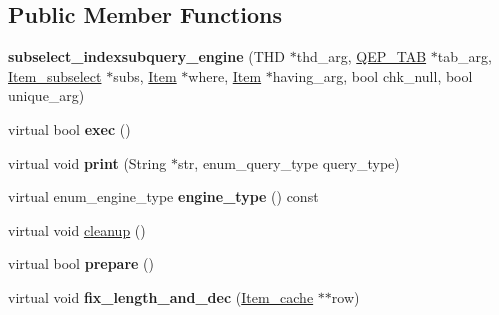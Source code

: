 \subsection*{Public Member Functions}
\begin{DoxyCompactItemize}
\item 
\mbox{\label{classsubselect__indexsubquery__engine_ab82444e407990fa6239accace7323951}} 
{\bfseries subselect\+\_\+indexsubquery\+\_\+engine} (T\+HD $\ast$thd\+\_\+arg, \mbox{\hyperlink{classQEP__TAB}{Q\+E\+P\+\_\+\+T\+AB}} $\ast$tab\+\_\+arg, \mbox{\hyperlink{classItem__subselect}{Item\+\_\+subselect}} $\ast$subs, \mbox{\hyperlink{classItem}{Item}} $\ast$where, \mbox{\hyperlink{classItem}{Item}} $\ast$having\+\_\+arg, bool chk\+\_\+null, bool unique\+\_\+arg)
\item 
\mbox{\label{classsubselect__indexsubquery__engine_a5eedf659adbcec020dfeabb8ffc7c261}} 
virtual bool {\bfseries exec} ()
\item 
\mbox{\label{classsubselect__indexsubquery__engine_a40f9e9028e88c03598675963ed70e273}} 
virtual void {\bfseries print} (String $\ast$str, enum\+\_\+query\+\_\+type query\+\_\+type)
\item 
\mbox{\label{classsubselect__indexsubquery__engine_ac8bf67f3d2bdfc98deae80f7464ed656}} 
virtual enum\+\_\+engine\+\_\+type {\bfseries engine\+\_\+type} () const
\item 
virtual void \mbox{\hyperlink{classsubselect__indexsubquery__engine_a185f036d8ce8517de313c2b796b4b060}{cleanup}} ()
\item 
\mbox{\label{classsubselect__indexsubquery__engine_a614a68b3201d47f6b00e3b2a8ce86fde}} 
virtual bool {\bfseries prepare} ()
\item 
\mbox{\label{classsubselect__indexsubquery__engine_a88543496d0b77b1bc2904e33cae9259f}} 
virtual void {\bfseries fix\+\_\+length\+\_\+and\+\_\+dec} (\mbox{\hyperlink{classItem__cache}{Item\+\_\+cache}} $\ast$$\ast$row)
\item 
\mbox{\label{classsubselect__indexsubquery__engine_a39c2db5d643fd4c3aaf5df46f456e6c4}} 
$$
\end{DoxyCompactItemize}
